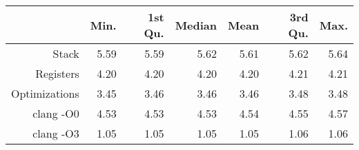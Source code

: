\begin{table}[ht]
\centering
\begin{tabular}{rrrrrrr}
  \hline
 & Min. & 1st Qu. & Median & Mean & 3rd Qu. & Max. \\ 
  \hline
Stack & 5.59 & 5.59 & 5.62 & 5.61 & 5.62 & 5.64 \\ 
  Registers & 4.20 & 4.20 & 4.20 & 4.20 & 4.21 & 4.21 \\ 
  Optimizations & 3.45 & 3.46 & 3.46 & 3.46 & 3.48 & 3.48 \\ 
  clang -O0 & 4.53 & 4.53 & 4.53 & 4.54 & 4.55 & 4.57 \\ 
  clang -O3 & 1.05 & 1.05 & 1.05 & 1.05 & 1.06 & 1.06 \\ 
   \hline
\end{tabular}
\end{table}
